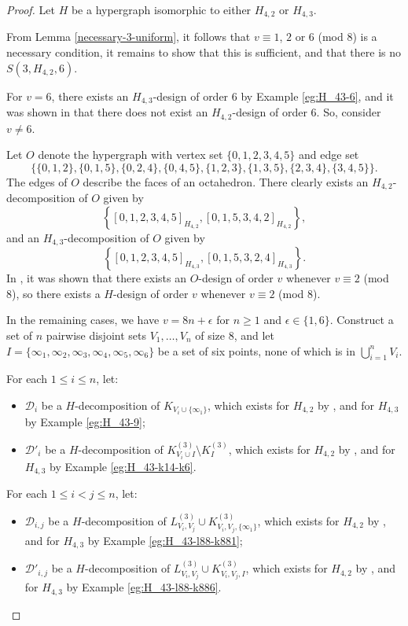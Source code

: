 \begin{proof}
Let $H$ be a hypergraph isomorphic to either $H_{4,2}$ or $H_{4,3}$.

From Lemma \ref{necessary-3-uniform}, it follows that $v \equiv 1$, $2$ or $6$ (mod $8$) is a necessary condition,
   it remains to show that this is sufficient, and that there is no $S(3, H_{4,2}, 6)$.

For $v = 6$, there exists an $H_{4,3}$-design of order 6 by Example \ref{eg:H_43-6},
  and it was shown in \cite{bryant} that there does not exist an $H_{4,2}$-design of order 6. So, consider $v \neq 6$.

Let $O$ denote the hypergraph with vertex set $\{0,1,2,3,4,5\}$ and edge set
\[
    \{\{0,1,2\},\{0,1,5\},\{0,2,4\},\{0,4,5\},\{1,2,3\},\{1,3,5\},\{2,3,4\},\{3,4,5\}\}.
\]
The edges of $O$ describe the faces of an octahedron.
There clearly exists an $H_{4,2}$-decomposition of $O$ given by \[ \left\{ [0,1,2,3,4,5]_{H_{4,2}}, [0,1,5,3,4,2]_{H_{4,2}} \right\}, \]
  and an $H_{4,3}$-decomposition of $O$ given by \[ \left\{[0,1,2,3,4,5]_{H_{4,3}}, [0,1,5,3,2,4]_{H_{4,3}} \right\}. \]
In \cite{hanani}, it was shown that there exists an $O$-design of order $v$ whenever $v \equiv 2$ (mod 8),
  so there exists a $H$-design of order $v$ whenever $v \equiv 2$ (mod 8).


In the remaining cases, we have $v = 8n + \epsilon$ for $n \geq 1$ and $\epsilon \in \{1,6\}$.
Construct a set of $n$ pairwise disjoint sets $V_1, \ldots, V_n$ of size 8,
  and let $I = \{\infty_1, \infty_2, \infty_3, \infty_4, \infty_5, \infty_6\}$ be a set of six points, none of which is in $\bigcup_{i=1}^{n} V_i$.


For each $1 \leq i \leq n$, let:
\begin{itemize}
  \item $\mathcal{D}_i$ be a $H$-decomposition of $K_{V_i \cup \{\infty_1\}}$,
  which exists for $H_{4,2}$ by \cite{bryant}, and for $H_{4,3}$ by Example \ref{eg:H_43-9};
  \item $\mathcal{D}'_i$ be a $H$-decomposition of $K_{V_i \cup I}^{(3)} \setminus K_{I}^{(3)}$,
  which exists for $H_{4,2}$ by \cite{bryant}, and for $H_{4,3}$ by Example \ref{eg:H_43-k14-k6}.
\end{itemize}

For each $1 \leq i < j \leq n$, let:
\begin{itemize}
  \item $\mathcal{D}_{i,j}$ be a $H$-decomposition of $L_{V_i,V_j}^{(3)} \cup K_{V_i,V_j,\{\infty_1\}}^{(3)}$,
  which exists for $H_{4,2}$ by \cite{bryant}, and for $H_{4,3}$ by Example \ref{eg:H_43-l88-k881};
  \item $\mathcal{D}'_{i,j}$ be a $H$-decomposition of $L_{V_i,V_j}^{(3)} \cup K_{V_i,V_j,I}^{(3)}$,
  which exists for $H_{4,2}$ by \cite{bryant}, and for $H_{4,3}$ by Example \ref{eg:H_43-l88-k886}.
\end{itemize}


\end{proof}
